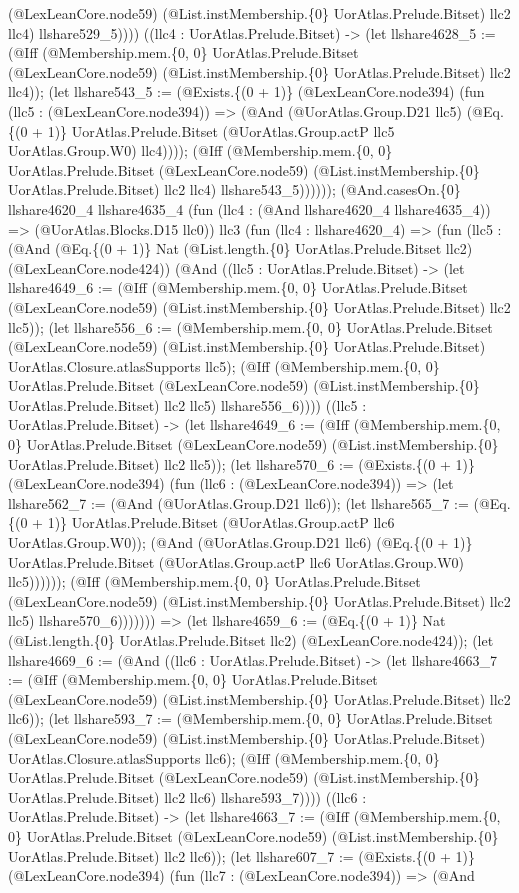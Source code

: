 \documentclass[11pt]{article}
\begin{document}
(@LexLeanCore.node59) (@List.instMembership.\{0\} UorAtlas.Prelude.Bitset) llc2 llc4) llshare529\_5)))) ((llc4 : UorAtlas.Prelude.Bitset) -> (let llshare4628\_5 := (@Iff (@Membership.mem.\{0, 0\} UorAtlas.Prelude.Bitset (@LexLeanCore.node59) (@List.instMembership.\{0\} UorAtlas.Prelude.Bitset) llc2 llc4)); (let llshare543\_5 := (@Exists.\{(0 + 1)\} (@LexLeanCore.node394) (fun (llc5 : (@LexLeanCore.node394)) => (@And (@UorAtlas.Group.D21 llc5) (@Eq.\{(0 + 1)\} UorAtlas.Prelude.Bitset (@UorAtlas.Group.actP llc5 UorAtlas.Group.W0) llc4)))); (@Iff (@Membership.mem.\{0, 0\} UorAtlas.Prelude.Bitset (@LexLeanCore.node59) (@List.instMembership.\{0\} UorAtlas.Prelude.Bitset) llc2 llc4) llshare543\_5)))))); (@And.casesOn.\{0\} llshare4620\_4 llshare4635\_4 (fun (llc4 : (@And llshare4620\_4 llshare4635\_4)) => (@UorAtlas.Blocks.D15 llc0)) llc3 (fun (llc4 : llshare4620\_4) => (fun (llc5 : (@And (@Eq.\{(0 + 1)\} Nat (@List.length.\{0\} UorAtlas.Prelude.Bitset llc2) (@LexLeanCore.node424)) (@And ((llc5 : UorAtlas.Prelude.Bitset) -> (let llshare4649\_6 := (@Iff (@Membership.mem.\{0, 0\} UorAtlas.Prelude.Bitset (@LexLeanCore.node59) (@List.instMembership.\{0\} UorAtlas.Prelude.Bitset) llc2 llc5)); (let llshare556\_6 := (@Membership.mem.\{0, 0\} UorAtlas.Prelude.Bitset (@LexLeanCore.node59) (@List.instMembership.\{0\} UorAtlas.Prelude.Bitset) UorAtlas.Closure.atlasSupports llc5); (@Iff (@Membership.mem.\{0, 0\} UorAtlas.Prelude.Bitset (@LexLeanCore.node59) (@List.instMembership.\{0\} UorAtlas.Prelude.Bitset) llc2 llc5) llshare556\_6)))) ((llc5 : UorAtlas.Prelude.Bitset) -> (let llshare4649\_6 := (@Iff (@Membership.mem.\{0, 0\} UorAtlas.Prelude.Bitset (@LexLeanCore.node59) (@List.instMembership.\{0\} UorAtlas.Prelude.Bitset) llc2 llc5)); (let llshare570\_6 := (@Exists.\{(0 + 1)\} (@LexLeanCore.node394) (fun (llc6 : (@LexLeanCore.node394)) => (let llshare562\_7 := (@And (@UorAtlas.Group.D21 llc6)); (let llshare565\_7 := (@Eq.\{(0 + 1)\} UorAtlas.Prelude.Bitset (@UorAtlas.Group.actP llc6 UorAtlas.Group.W0)); (@And (@UorAtlas.Group.D21 llc6) (@Eq.\{(0 + 1)\} UorAtlas.Prelude.Bitset (@UorAtlas.Group.actP llc6 UorAtlas.Group.W0) llc5)))))); (@Iff (@Membership.mem.\{0, 0\} UorAtlas.Prelude.Bitset (@LexLeanCore.node59) (@List.instMembership.\{0\} UorAtlas.Prelude.Bitset) llc2 llc5) llshare570\_6))))))) => (let llshare4659\_6 := (@Eq.\{(0 + 1)\} Nat (@List.length.\{0\} UorAtlas.Prelude.Bitset llc2) (@LexLeanCore.node424)); (let llshare4669\_6 := (@And ((llc6 : UorAtlas.Prelude.Bitset) -> (let llshare4663\_7 := (@Iff (@Membership.mem.\{0, 0\} UorAtlas.Prelude.Bitset (@LexLeanCore.node59) (@List.instMembership.\{0\} UorAtlas.Prelude.Bitset) llc2 llc6)); (let llshare593\_7 := (@Membership.mem.\{0, 0\} UorAtlas.Prelude.Bitset (@LexLeanCore.node59) (@List.instMembership.\{0\} UorAtlas.Prelude.Bitset) UorAtlas.Closure.atlasSupports llc6); (@Iff (@Membership.mem.\{0, 0\} UorAtlas.Prelude.Bitset (@LexLeanCore.node59) (@List.instMembership.\{0\} UorAtlas.Prelude.Bitset) llc2 llc6) llshare593\_7)))) ((llc6 : UorAtlas.Prelude.Bitset) -> (let llshare4663\_7 := (@Iff (@Membership.mem.\{0, 0\} UorAtlas.Prelude.Bitset (@LexLeanCore.node59) (@List.instMembership.\{0\} UorAtlas.Prelude.Bitset) llc2 llc6)); (let llshare607\_7 := (@Exists.\{(0 + 1)\} (@LexLeanCore.node394) (fun (llc7 : (@LexLeanCore.node394)) => (@And 
\end{document}
